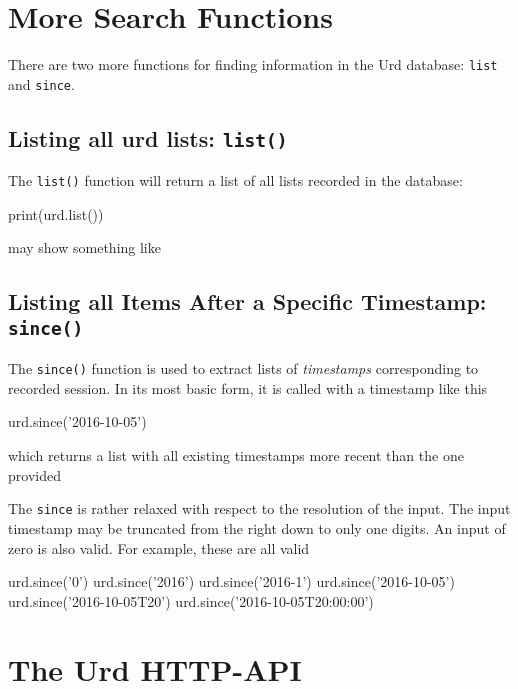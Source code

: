 \section{More Search Functions}
\label{sec:more_urd_search}

There are two more functions for finding information in the Urd
database: \texttt{list} and \texttt{since}.



\subsection{Listing all urd lists:  \texttt{list()}}
The \texttt{list()} function will return a list of all lists recorded in
the database:
\begin{python}
print(urd.list())
\end{python}
may show something like
\begin{shell}
\end{shell}



\subsection{Listing all Items After a Specific Timestamp:  \texttt{since()}}
The \texttt{since()} function is used to extract lists of \textsl{timestamps}
corresponding to recorded session.  In its most basic form, it is called
with a timestamp like this
\begin{python}
urd.since('2016-10-05')
\end{python}
which returns a list with all existing timestamps more recent than the
one provided
\begin{shell}
['2016-10-06', '2016-10-07', '2016-10-08', '2016-10-09', '2016-10-09T20']
\end{shell}
The \texttt{since} is rather relaxed with respect to the resolution of
the input.  The input timestamp may be truncated from the right down
to only one digits.  An input of zero is also valid.  For example,
these are all valid
\begin{python}
urd.since('0')
urd.since('2016')
urd.since('2016-1')
urd.since('2016-10-05')
urd.since('2016-10-05T20')
urd.since('2016-10-05T20:00:00')
\end{python}





\section{The Urd HTTP-API}

